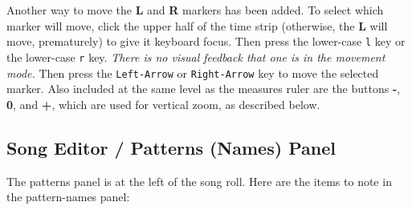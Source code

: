    Another way to move the \textbf{L} and \textbf{R} markers has been added.
   To select which marker will move, click the upper half of the time
   strip (otherwise, the \textbf{L} will move,
   prematurely) to give it keyboard focus.
   Then press the lower-case
   \texttt{l} key or the lower-case
   \texttt{r} key.
   \textsl{There is no visual feedback that one is in the movement mode.}
   Then press the \texttt{Left-Arrow} or \texttt{Right-Arrow}
   key to move the selected marker.
   Also included at the same level as the measures ruler are the buttons
   \textbf{-}, \textbf{0}, and \textbf{+},
   which are used for vertical zoom, as described below.

\subsection{Song Editor / Patterns (Names) Panel}
\label{subsec:song_editor_patterns_panel}

   The patterns panel is at the left of the song roll.
   Here are the items to note in the pattern-names panel:


